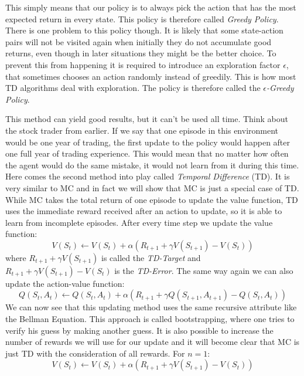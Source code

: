 This simply means that our policy is to always pick the action that has the most expected return in every state. This policy is therefore called \emph{Greedy Policy}.
There is one problem to this policy though. It is likely that some state-action pairs will not be visited again when initially they do not accumulate good returns, even though in later situations they might be the better choice.
To prevent this from happening it is required to introduce an exploration factor $\epsilon$, that sometimes chooses an action randomly instead of greedily.
This is how most TD algorithms deal with exploration.
The policy is therefore called the \emph{$\epsilon$-Greedy Policy}.


This method can yield good results, but it can't be used all time.
Think about the stock trader from earlier. If we say that one episode in this environment would be one year of trading, the first update to the policy would happen after one full year of trading experience.
This would mean that no matter how often the agent would do the same mistake, it would not learn from it during this time.
Here comes the second method into play called \emph{Temporal Difference} (TD).
It is very similar to MC and in fact we will show that MC is just a special case of TD.
While MC takes the total return of one episode to update the value function, TD uses the immediate reward received after an action to update, so it is able to learn from incomplete episodes.
After every time step we update the value function:
\begin{equation} \label{eq:td_v}
	V(S_t) \leftarrow V(S_t) + \alpha (R_{t+1} + \gamma V(S_{t+1}) - V(S_t))
\end{equation}
where $R_{t+1} + \gamma V(S_{t+1})$ is called the \emph{TD-Target} and $R_{t+1} + \gamma V(S_{t+1}) - V(S_t)$ is the \emph{TD-Error}.
The same way again we can also update the action-value function:
\begin{equation} \label{eq:td_q}
	Q(S_t, A_t) \leftarrow Q(S_t, A_t) + \alpha (R_{t+1} + \gamma Q(S_{t+1}, A_{t+1}) - Q(S_t, A_t))
\end{equation}
We can now see that this updating method uses the same recursive attribute like the Bellman Equation.
This approach is called bootstrapping, where one tries to verify his guess by making another guess.
It is also possible to increase the number of rewards we will use for our update and it will become clear that MC is just TD with the consideration of all rewards.
For $n = 1$:
\begin{equation} \label{eq:td_v}
	V(S_t) \leftarrow V(S_t) + \alpha (R_{t+1} + \gamma V(S_{t+1}) - V(S_t))
\end{equation}
